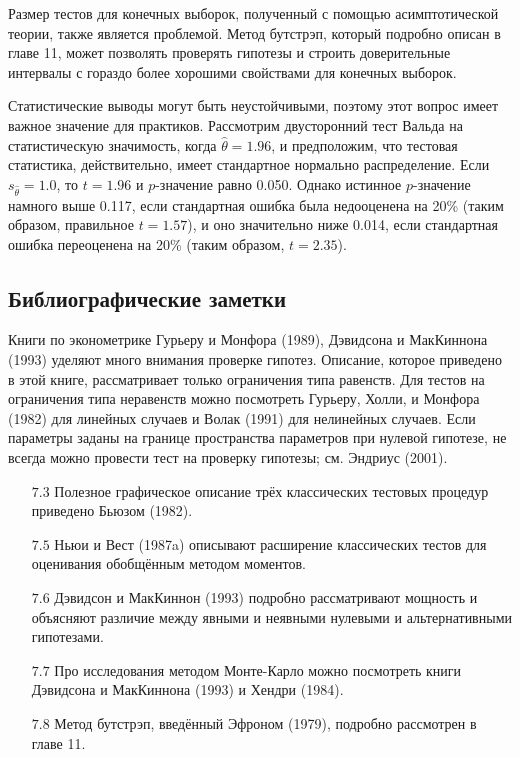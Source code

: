 Размер тестов для конечных выборок, полученный с помощью асимптотической теории, также является проблемой. Метод бутстрэп, который подробно описан в главе 11, может позволять проверять гипотезы и строить доверительные интервалы с гораздо более хорошими свойствами для конечных выборок.

Статистические выводы могут быть неустойчивыми, поэтому этот вопрос имеет важное значение для практиков. Рассмотрим двусторонний тест Вальда на статистическую значимость, когда $\hat{\theta} = 1.96$, и предположим, что тестовая статистика, действительно, имеет стандартное нормально распределение. Если $s_{\hat{\theta}} = 1.0$, то $t = 1.96$ и $p$-значение равно 0.050. Однако истинное $p$-значение намного выше 0.117, если стандартная ошибка была недооценена на 20\% (таким образом, правильное $t = 1.57$), и оно значительно ниже 0.014, если стандартная ошибка переоценена на 20\% (таким образом, $t = 2.35$).

\subsection{Библиографические заметки}

Книги по эконометрике Гурьеру и Монфора (1989), Дэвидсона и МакКиннона (1993) уделяют много внимания проверке гипотез. Описание, которое приведено в этой книге, рассматривает только ограничения типа равенств. Для тестов на ограничения типа неравенств можно посмотреть Гурьеру, Холли, и Монфора (1982) для линейных случаев и Волак (1991) для нелинейных случаев. Если параметры заданы на границе пространства параметров при нулевой гипотезе, не всегда можно провести тест на проверку гипотезы; см. Эндриус (2001).
\begin{itemize}
\item [$7.3$] Полезное графическое описание трёх классических тестовых процедур приведено Бьюзом (1982).
\item [$7.5$] Ньюи и Вест (1987a) описывают расширение классических тестов для оценивания обобщённым методом моментов.
\item [$7.6$] Дэвидсон и МакКиннон (1993) подробно рассматривают мощность и объясняют различие между явными и неявными нулевыми и альтернативными гипотезами.
\item [$7.7$] Про исследования методом Монте-Карло можно посмотреть книги Дэвидсона и МакКиннона (1993) и Хендри (1984). 
\item [$7.8$] Метод бутстрэп, введённый Эфроном (1979), подробно рассмотрен в главе 11.
\end{itemize}

